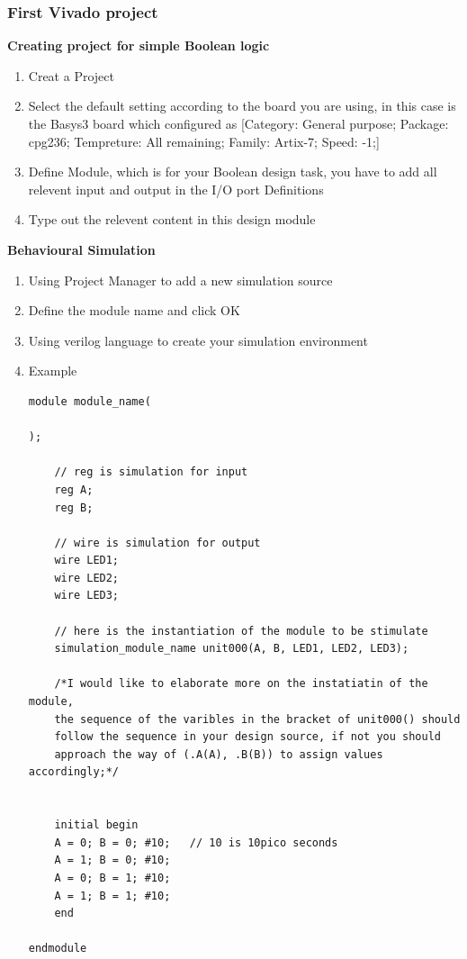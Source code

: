 \documentclass{article}
\begin{document}
\subsubsection{First Vivado project}
\textbf{Creating project for simple Boolean logic}
\begin{enumerate}
    \item Creat a Project
    \item Select the default setting according to the board you are using, in this case is the Basys3 board which configured as [Category: General purpose; Package: cpg236; Tempreture: All remaining; Family: Artix-7; Speed: -1;]
    \item Define Module, which is for your Boolean design task, you have to add all relevent input and output in the I/O port Definitions
    \item Type out the relevent content in this design module
\end{enumerate}
\textbf{Behavioural Simulation}
\begin{enumerate}
    \item Using Project Manager to add a new simulation source
    \item Define the module name and click OK
    \item Using verilog language to create your simulation environment
    \item Example
    \begin{verbatim}
module module_name(

);

    // reg is simulation for input
    reg A;    
    reg B;

    // wire is simulation for output
    wire LED1;
    wire LED2;
    wire LED3;  

    // here is the instantiation of the module to be stimulate
    simulation_module_name unit000(A, B, LED1, LED2, LED3);

    /*I would like to elaborate more on the instatiatin of the module,
    the sequence of the varibles in the bracket of unit000() should
    follow the sequence in your design source, if not you should
    approach the way of (.A(A), .B(B)) to assign values accordingly;*/
    

    initial begin
    A = 0; B = 0; #10;   // 10 is 10pico seconds
    A = 1; B = 0; #10; 
    A = 0; B = 1; #10;
    A = 1; B = 1; #10; 
    end
    
endmodule
    \end{verbatim}
\end{enumerate}
\end{document}
